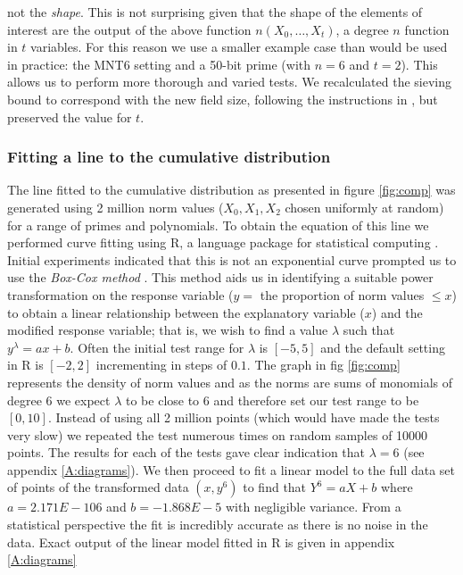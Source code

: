 \documentclass[a4paper, 12pt, envcountsect, runningheads]{llncs}
\numberwithin{figure}{section}
\numberwithin{equation}{section}
\begin{document}
not the \textit{shape}. This is not surprising given that the shape of the elements of interest are the output of the above function $n(X_0,\ldots,X_t)$, a degree $n$ function in $t$ variables. For this reason we use a smaller example case than would be used in practice: the MNT6 setting and a 50-bit prime (with $n=6$ and $t=2$). This allows us to perform more thorough and varied tests. We recalculated the sieving bound to correspond with the new field size, following the instructions in \cite{joux-lercier-smart-vercauteren06}, but preserved the value for $t$.


\subsubsection*{Fitting a line to the cumulative distribution}
The line fitted to the cumulative distribution as presented in figure \ref{fig:comp} was generated using 2 million norm values ($X_0,X_1,X_2$ chosen uniformly at random) for a range of primes and polynomials. To obtain the equation of this line we performed curve fitting using R, a language package for statistical computing \cite{R}. Initial experiments indicated that this is not an exponential curve prompted us to use the {\em Box-Cox method} \cite{box-cox}. This method aids us in identifying a suitable power transformation on the response variable ($y=$ the proportion of norm values $\leq x$) to obtain a linear relationship between the explanatory variable ($x$) and the modified response variable; that is, we wish to find a value $\lambda$ such that $y^\lambda=ax+b$. Often the initial test range for $\lambda$ is $[-5,5]$ and the default setting in R is $[-2,2]$ incrementing in steps of $0.1$. The graph in fig \ref{fig:comp} represents the density of norm values and as the norms are sums of monomials of degree 6 we expect $\lambda$ to be close to 6 and therefore set our test range to be $[0,10]$. Instead of using all 2 million points (which would have made the tests very slow) we repeated the test numerous times on random samples of 10000 points. The results for each of the tests gave clear indication that $\lambda=6$ (see appendix \ref{A:diagrams}). 
We then proceed to fit a linear model to the full data set of points of the transformed data $(x,y^6)$ to find that $Y^6=aX+b$ where $a=2.171E-106$ and $b=-1.868E-5$ with negligible variance. From a statistical perspective the fit is incredibly accurate as there is no noise in the data. Exact output of the linear model fitted in R is given in appendix \ref{A:diagrams}
\end{document}
